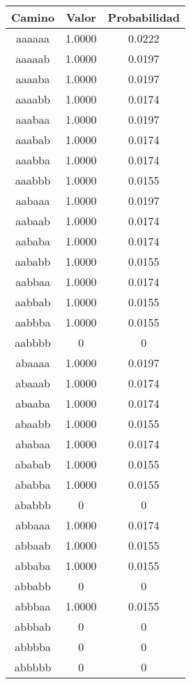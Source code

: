 \begin{figure}[hbpt]
\begin{minipage}{0.48\textwidth}
\begin{center}
\begin{tabular}{|c|c|c|}
\hline
\textbf{Camino} & \textbf{Valor} & \textbf{Probabilidad} \\
\hline
aaaaaa  &  1.0000  &  0.0222  \\
aaaaab  &  1.0000  &  0.0197  \\
aaaaba  &  1.0000  &  0.0197  \\
aaaabb  &  1.0000  &  0.0174  \\
aaabaa  &  1.0000  &  0.0197  \\
aaabab  &  1.0000  &  0.0174  \\
aaabba  &  1.0000  &  0.0174  \\
aaabbb  &  1.0000  &  0.0155  \\
aabaaa  &  1.0000  &  0.0197  \\
aabaab  &  1.0000  &  0.0174  \\
aababa  &  1.0000  &  0.0174  \\
aababb  &  1.0000  &  0.0155  \\
aabbaa  &  1.0000  &  0.0174  \\
aabbab  &  1.0000  &  0.0155  \\
aabbba  &  1.0000  &  0.0155  \\
aabbbb  & 0 & 0 \\
abaaaa  &  1.0000  &  0.0197  \\
abaaab  &  1.0000  &  0.0174  \\
abaaba  &  1.0000  &  0.0174  \\
abaabb  &  1.0000  &  0.0155  \\
ababaa  &  1.0000  &  0.0174  \\
ababab  &  1.0000  &  0.0155  \\
ababba  &  1.0000  &  0.0155  \\
ababbb  & 0 & 0 \\
abbaaa  &  1.0000  &  0.0174  \\
abbaab  &  1.0000  &  0.0155  \\
abbaba  &  1.0000  &  0.0155  \\
abbabb  & 0 & 0 \\
abbbaa  &  1.0000  &  0.0155  \\
abbbab  & 0 & 0 \\
abbbba  & 0 & 0 \\
abbbbb  & 0 & 0 \\

\end{tabular}
\end{center}
\end{minipage}
\end{figure}
